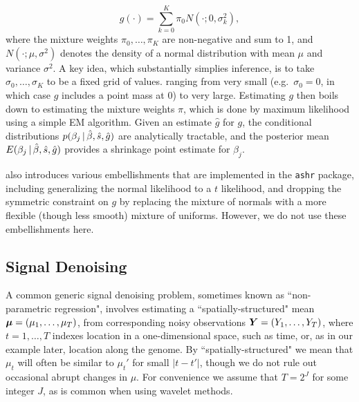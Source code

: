 \documentclass[12pt]{article}
\begin{document}
\begin{equation}
g(\cdot)=\sum_{k=0}^K \pi_0 N(\cdot;0,\sigma_k^2),
\end{equation}
where the mixture weights $\pi_0,\dots,\pi_K$ are non-negative and sum to 1, and $N(\cdot; \mu,\sigma^2)$ denotes
the density of a normal distribution with mean $\mu$ and variance $\sigma^2$.
A key idea, which substantially simplies inference, is to take
$\sigma_0,\dots,\sigma_K$ to be a fixed grid of values. ranging from very small (e.g.~$\sigma_0=0$,
in which case $g$ includes a point mass at 0) to very large. Estimating $g$ then boils down to estimating
the mixture weights $\pi$, which is done by maximum likelihood using a simple EM algorithm.
Given an estimate $\hat{g}$ for $g$, the conditional distributions $p(\beta_j \,|\, \hat{\beta}, \hat{s}, \hat{g})$ are analytically
tractable, and the posterior mean $E(\beta_j \,|\, \hat{\beta}, \hat{s}, \hat{g})$ provides a shrinkage point estimate for $\beta_j$.

\cite{stephens:2015} also introduces various embellishments that are implemented in the {\tt ashr}
package, including generalizing the normal likelihood to a $t$ likelihood, and dropping the symmetric
constraint on $g$ by replacing the mixture
of normals with a more flexible (though less smooth) mixture of uniforms. However, we do not use these embellishments here. 



\subsection{Signal Denoising}

A common generic signal denoising problem, sometimes known as ``non-parametric regression", involves
estimating a ``spatially-structured" mean $\bm{\mu}=(\mu_1,\dots,\mu_T)$, from corresponding
noisy observations $\bm{Y} = (Y_1,\dots,Y_T)$, where $t=1,\dots,T$ indexes location in a one-dimensional space,
such as time, or, as in our example later, location along the genome. 
 By ``spatially-structured" we mean that $\mu_t$ will often be similar to $\mu_t'$ for small $|t-t'|$, though we do not rule
out occasional abrupt changes in $\mu$.  For convenience we assume that $T=2^J$ for some integer $J$, as is common when using wavelet methods.
\end{document}
